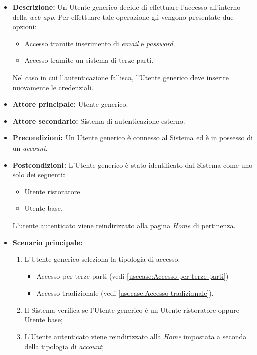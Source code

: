 \label{usecase:Effettua accesso}

\begin{itemize}
	\item \textbf{Descrizione:} Un Utente generico decide di effettuare l'accesso all'interno della \textit{web app}. Per effettuare tale
	operazione gli vengono presentate due opzioni:
	\begin{itemize}
		\item Accesso tramite inserimento di \textit{email} e \textit{password}.
		\item Accesso tramite un sistema di terze parti.
	\end{itemize}
	Nel caso in cui l'autenticazione fallisca, l'Utente generico deve inserire nuovamente le credenziali.

	\item \textbf{Attore principale:} Utente generico.
	\item \textbf{Attore secondario:} Sistema di autenticazione esterno.
	\item \textbf{Precondizioni:}
	      Un Utente generico è connesso al Sistema ed è in possesso di un \textit{account}.
	\item \textbf{Postcondizioni:}
	      L'Utente generico è stato identificato dal Sistema come uno solo dei seguenti:
	      \begin{itemize}
		      \item Utente ristoratore.
		      \item Utente base.
	      \end{itemize}
		  L'utente autenticato viene reindirizzato alla pagina \textit{Home} di pertinenza.

	\item \textbf{Scenario principale:}
	      \begin{enumerate}
		      \item L'Utente generico seleziona la tipologia di accesso: 

			  \begin{itemize}
				\item Accesso per terze parti (vedi \autoref{usecase:Accesso per terze parti})
				\item Accesso tradizionale (vedi \autoref{usecase:Accesso tradizionale}).
			  \end{itemize}

		      \item Il Sistema verifica se l'Utente generico è un Utente ristoratore oppure Utente base;
		      \item L'Utente autenticato viene reindirizzato alla \textit{Home} impostata a seconda della tipologia di \textit{account};		
	      \end{enumerate}
		

\end{itemize}
